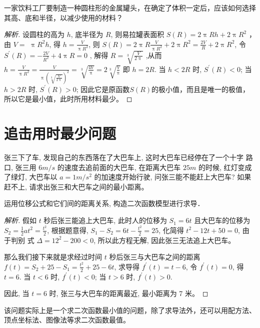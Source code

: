 \begin{example}
  一家饮料工厂要制造一种圆柱形的金属罐头，在确定了体积一定后，应该如何选择其高、底和半径，以减少使用的材料？
\end{example}


\begin{proof}[解析]
  设圆柱的高为 $h$, 底半径为 $R$, 则易拉罐表面积 $S(R)=2 \uppi R h+2 \uppi R^{2}$ ，由 $V=$ $\uppi R^{2} h$, 得 $h=\frac{V}{\uppi R^{2}}$, 则 $S(R)=2 \uppi R \frac{V}{\uppi R^{2}}+2 \uppi R^{2}=\frac{2 V}{R}+2 \uppi R^{2}$, 令 $S^{\prime}(R)=-\frac{2 V}{R^{2}}+4 \uppi R=0$  , 
  解得 $R=\sqrt[3]{\frac{V}{2 \uppi}}$ ,从而 $h=\frac{V}{\uppi R^{2}}=\frac{V}{\uppi(\sqrt[3]{\frac{V}{2 \uppi}})^{2}}=\sqrt[3]{\frac{4 V}{\uppi}}=2 \sqrt[3]{\frac{V}{\uppi}}$ 即 $h=2 R$.
  当 $h<2 R$ 时, $S^{\prime}(R)<0$; 当 $h>2 R$ 时, $S^{\prime}(R)>0$; 因此它是原函数$S(R)$的极小值，而且是唯一的极值，所以它是最小值，此时所用材料最少。
\end{proof}


\section{追击用时最少问题}

\begin{example}
  张三下了车, 发现自己的东西落在了大巴车上, 这时大巴车已经停在了一个十字 路口, 张三用 $6 \unit{m\per s}$ 的速度去追前面的大巴车, 在距离大巴车 $25 \unit{m}$ 的时候, 红灯变成 了绿灯, 大巴车以 ${a}=1 \unit{m \per s^2}$ 的加速度开始行驶, 问张三能不能赶上大巴车? 如果赶不上, 请求出张三和大巴车之间的最小距离\cite{张双林2013导数在实际生活中的最优化应用}。
\end{example}

\begin{analysis}
  运用位移公式和它们间的距离关系, 构造二次函数模型进行求导．
\end{analysis}

\begin{proof}[解析]
  假如 ${t}$ 秒后张三能追上大巴车, 此时人的位移为 $S_{1}=6 t$ 且大巴车的位移为 $S_{2}=\frac{1}{2} {at}^{2}=\frac{t^{2}}{2}$, 根据题意得, $S_{1}-S_{2}=6 t-\frac{t^{2}}{2}=25$, 化简得 $t^{2}-12 t+50=0$, 由于判别 式 $\Delta=12^{2}-200<0$, 所以此方程无解, 因此张三无法追上大巴车。

  那么我们接下来就是求经过时间 ${t}$ 秒后张三与大巴车之间的距离 $f(t)=S_{2}+25-S_{1}=\frac{t^{2}}{2}+25-6 t$, 求导得 $f^{\prime}(t)=t-6$, 令 $f^{\prime}(t)=0$, 得 $t=6$. 当 ${t}<6$ 时, ${f}^{\prime}({t})<0$; 当 $t>6$ 时, ${f}^{\prime}(t)>0$.

  因此, 当 ${t}=6$ 时, 张三与大巴车的距离最近, 最小距离为 7 米。
\end{proof}

\begin{review}
  该问题实际上是一个求二次函数最小值的问题，除了求导法外，还可以用配方法、顶点坐标法、图像法等求二次函数最值。
\end{review}